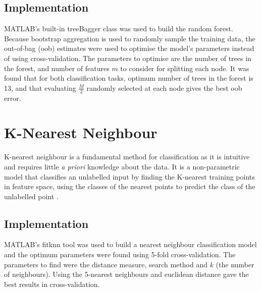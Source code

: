 \subsection{Implementation}

MATLAB's built-in treeBagger class was used to build the random forest. Because bootstrap aggregation is used to randomly sample the training data, the out-of-bag (oob) estimates were used to optimise the model's parameters instead of using cross-validation. The parameters to optimise are the number of trees in the forest, and number of features $m$ to consider for splitting each node. It was found that for both classification tasks, optimum number of trees in the forest is 13, and that evaluating $\frac{M}{2}$ randomly selected at each node gives the best oob error.

\section{K-Nearest Neighbour}

K-nearest neighbour is a fundamental method for classification as it is intuitive and requires little \textit{a priori} knowledge about the data. It is a non-parametric model that classifies an unlabelled input by finding the K-nearest training points in feature space, using the classes of the nearest points to predict the class of the unlabelled point \cite{Peterson}. 

\subsection{Implementation}

MATLAB's fitknn tool was used to build a nearest neighbour classification model and the optimum parameters were found using 5-fold cross-validation. The parameters to find were the distance measure, search method and $k$ (the number of neighbours). Using the 5-nearest neighbours and euclidean distance gave the best results in cross-validation.

